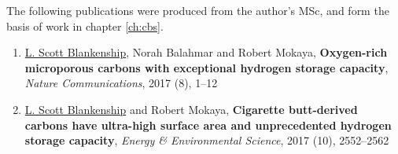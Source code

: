 The following publications were produced from the author's MSc, and form the basis of work in chapter \ref{ch:cbs}.

\begin{enumerate}[resume, label=\Roman*, ref={\textbf{Publication \Roman*}}]
    \item \underline{L. Scott Blankenship}, Norah Balahmar and Robert Mokaya, \textbf{Oxygen-rich microporous carbons with exceptional hydrogen storage capacity}, \textit{Nature Communications}, 2017 (8), 1–12
    \label{pub:CA}
    \item \underline{L. Scott Blankenship} and Robert Mokaya, \textbf{Cigarette butt-derived carbons have ultra-high surface area and unprecedented hydrogen storage capacity}, \textit{Energy \& Environmental Science}, 2017 (10), 2552–2562
    \label{pub:CB}
    
\end{enumerate}
